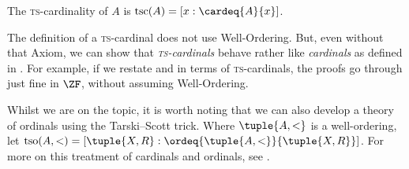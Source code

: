 \documentclass[../../../include/open-logic-section]{subfiles}
\begin{document}
\begin{defn}
The \textsc{ts}-cardinality of $A$ is $\text{tsc}(A) = [x :
\cardeq{A}{x}]$.
\end{defn}

The definition of a \textsc{ts}-cardinal does not use Well-Ordering.
But, even without that Axiom, we can show that
\emph{\textsc{ts}-cardinals} behave rather like \emph{cardinals} as
defined in .
For example, if we restate
 and
 in terms of
\textsc{ts}-cardinals, the proofs go through just fine in $\ZF$,
without assuming Well-Ordering. 

Whilst we are on the topic, it is worth noting that we can also
develop a theory of ordinals using the Tarski--Scott trick. Where
$\tuple{A, <}$ is a well-ordering, let $\text{tso}(A, <) = [\tuple{X,
R} : \ordeq{\tuple{A, <}}{\tuple{X, R}}]$. For more on this treatment
of cardinals and ordinals, see \cite[chs.~9--12]{Potter2004}.
\end{document}
